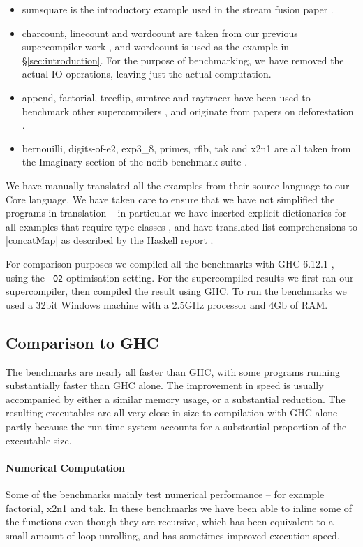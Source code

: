 \documentclass[draft]{sigplanconf}
\begin{document}
\begin{itemize}
\item sumsquare is the introductory example used in the stream fusion paper \cite{coutts:stream_fusion}.
\item charcount, linecount and wordcount are taken from our previous supercompiler work \cite{me:supero}, and wordcount is used as the example in \S\ref{sec:introduction}. For the purpose of benchmarking, we have removed the actual IO operations, leaving just the actual computation.
\item append, factorial, treeflip, sumtree and raytracer have been used to benchmark other supercompilers \cite{jonsson:supercompilation}, and originate from papers on deforestation \cite{wadler:deforestation,kort:raytracer}.
\item bernouilli, digits-of-e2, exp3\_8, primes, rfib, tak and x2n1 are all taken from the Imaginary section of the nofib benchmark suite \cite{nofib}.
\end{itemize}

We have manually translated all the examples from their source language to our Core language. We have taken care to ensure that we have not simplified the programs in translation -- in particular we have inserted explicit dictionaries for all examples that require type classes \cite{wadler:type_classes}, and have translated list-comprehensions to |concatMap| as described by the Haskell report \cite{haskell}.

For comparison purposes we compiled all the benchmarks with GHC 6.12.1 \cite{ghc6_12}, using the \texttt{-O2} optimisation setting. For the supercompiled results we first ran our supercompiler, then compiled the result using GHC. To run the benchmarks we used a 32bit Windows machine with a 2.5GHz processor and 4Gb of RAM.

\subsection{Comparison to GHC}

The benchmarks are nearly all faster than GHC, with some programs running substantially faster than GHC alone. The improvement in speed is usually accompanied by either a similar memory usage, or a substantial reduction. The resulting executables are all very close in size to compilation with GHC alone -- partly because the run-time system accounts for a substantial proportion of the executable size.

\paragraph{Numerical Computation} Some of the benchmarks mainly test numerical performance -- for example factorial, x2n1 and tak. In these benchmarks we have been able to inline some of the functions even though they are recursive, which has been equivalent to a small amount of loop unrolling, and has sometimes improved execution speed.
\end{document}

